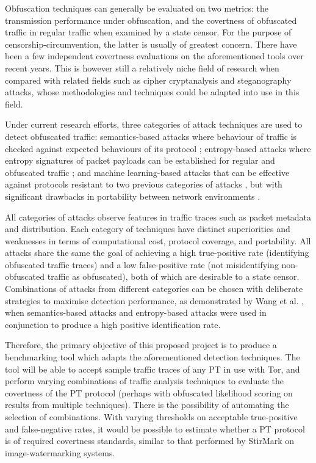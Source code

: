 \documentclass[11pt]{article}
\begin{document}
Obfuscation techniques can generally be evaluated on two metrics: the transmission performance under obfuscation, and the covertness of obfuscated traffic in regular traffic when examined by a state censor. For the purpose of censorship-circumvention, the latter is usually of greatest concern. There have been a few independent covertness evaluations on the aforementioned tools \cite{tan2015towards} \cite{houmansadr2013parrot} \cite{wang2015seeing} over recent years. This is however still a relatively niche field of research when compared with related fields such as cipher cryptanalysis and steganography attacks, whose methodologies and techniques could be adapted into use in this field.

Under current research efforts, three categories of attack techniques are used to detect obfuscated traffic: semantics-based attacks where behaviour of traffic is checked against expected behaviours of its protocol \cite[Sec. VIII]{houmansadr2013parrot} \cite[Sec. 4]{wang2015seeing}; entropy-based attacks where entropy signatures of packet payloads can be established for regular and obfuscated traffic \cite{tan2015towards} \cite[Sec. 5]{wang2015seeing}; and machine learning-based attacks that can be effective against protocols resistant to two previous categories of attacks \cite[Sec. 6]{wang2015seeing}, but with significant drawbacks in portability between network environments \cite{dixon2016network}. 

All categories of attacks observe features in traffic traces such as packet metadata and distribution. Each category of techniques have distinct superiorities and weaknesses in terms of computational cost, protocol coverage, and portability. All attacks share the same the goal of achieving a high true-positive rate (identifying obfuscated traffic traces) and a low false-positive rate (not misidentifying non-obfuscated traffic as obfuscated), both of which are desirable to a state censor. Combinations of attacks from different categories can be chosen with deliberate strategies to maximise detection performance, as demonstrated by Wang et al. \cite[Sec. 5.2]{wang2015seeing}, when semantics-based attacks and entropy-based attacks were used in conjunction to produce a high positive identification rate.

Therefore, the primary objective of this proposed project is to produce a benchmarking tool which adapts the aforementioned detection techniques. The tool will be able to accept sample traffic traces of any PT in use with Tor, and perform varying combinations of traffic analysis techniques to evaluate the covertness of the PT protocol (perhaps with obfuscated likelihood scoring on results from multiple techniques). There is the possibility of automating the selection of combinations. With varying thresholds on acceptable true-positive and false-negative rates, it would be possible to estimate whether a PT protocol is of required covertness standards, similar to that performed by StirMark \cite{petitcolas1998attacks} on image-watermarking systems.
\end{document}
